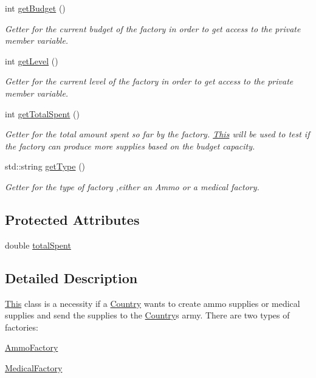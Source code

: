 \begin{DoxyCompactItemize}
int \mbox{\hyperlink{class_supply_factory_afbb886c670c202fa929913da4bc8ae7c}{get\+Budget}} ()
\begin{DoxyCompactList}\small\item\em Getter for the current budget of the factory in order to get access to the private member variable. \end{DoxyCompactList}\item 
int \mbox{\hyperlink{class_supply_factory_a9f75ffec504f752de0a7f4beb36ded96}{get\+Level}} ()
\begin{DoxyCompactList}\small\item\em Getter for the current level of the factory in order to get access to the private member variable. \end{DoxyCompactList}\item 
int \mbox{\hyperlink{class_supply_factory_a0633bf00c82f0d350fe29e02d21f0631}{get\+Total\+Spent}} ()
\begin{DoxyCompactList}\small\item\em Getter for the total amount spent so far by the factory. \mbox{\hyperlink{class_this}{This}} will be used to test if the factory can produce more supplies based on the budget capacity. \end{DoxyCompactList}\item 
std\+::string \mbox{\hyperlink{class_supply_factory_a8ddbed1efefb6a93df95f480953d85c6}{get\+Type}} ()
\begin{DoxyCompactList}\small\item\em Getter for the type of factory ,either an Ammo or a medical factory. \end{DoxyCompactList}\end{DoxyCompactItemize}
\subsection*{Protected Attributes}
\begin{DoxyCompactItemize}
\item 
double \mbox{\hyperlink{class_supply_factory_a750f6f87cfc10a860862e8f36043cf94}{total\+Spent}}
\end{DoxyCompactItemize}


\subsection{Detailed Description}
\mbox{\hyperlink{class_this}{This}} class is a necessity if a \mbox{\hyperlink{class_country}{Country}} wants to create ammo supplies or medical supplies and send the supplies to the \mbox{\hyperlink{class_country}{Country}}\textquotesingle{}s army. There are two types of factories\+:
\begin{DoxyItemize}
\item \mbox{\hyperlink{class_ammo_factory}{Ammo\+Factory}}
\item \mbox{\hyperlink{class_medical_factory}{Medical\+Factory}} 
\end{DoxyItemize}

